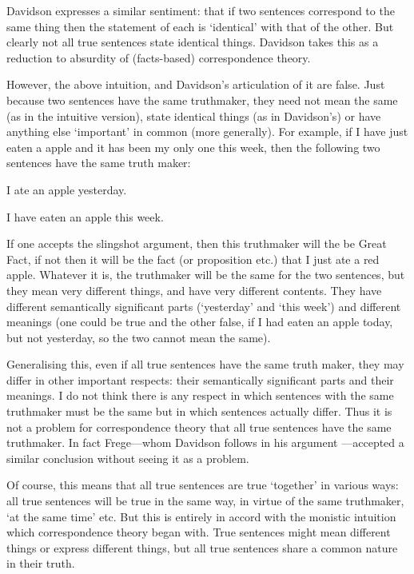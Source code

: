 Davidson expresses a similar sentiment: that if two sentences correspond to the same thing then the statement of each is `identical' with that of the other.
But clearly not all true sentences state identical things.
Davidson takes this as a reduction to absurdity of (facts-based) correspondence theory. %
\parencite[750]{Davidson_1969}

However, the above intuition, and Davidson's articulation of it are false.
Just because two sentences have the same truthmaker, they need not mean the same (as in the intuitive version), state identical things (as in Davidson's) or have anything else `important' in common (more generally).
For example, if I have just eaten a apple and it has been my only one this week, then the following two sentences have the same truth maker:

	\begin{example} \label{yesterday}
	I ate an apple yesterday.
	\end{example}

	\begin{example} \label{week}
	I have eaten an apple this week.
	\end{example}

If one accepts the slingshot argument, then this truthmaker will the be Great Fact, if not then it will be the fact (or proposition etc.) that I just ate a red apple.
Whatever it is, the truthmaker will be the same for the two sentences, but they mean very different things, and have very different contents.
They have different semantically significant parts (`yesterday' and `this week') and different meanings (one could be true and the other false, if I had eaten an apple today, but not yesterday, so the two cannot mean the same).

Generalising this, even if all true sentences have the same truth maker, they may differ in other important respects: their semantically significant parts and their meanings.
I do not think there is any respect in which sentences with the same truthmaker must be the same but in which sentences actually differ.
Thus it is not a problem for correspondence theory that all true sentences have the same truthmaker.
In fact Frege---whom Davidson follows in his argument \parencite[750]{Davidson_1969}---accepted a similar conclusion without seeing it as a problem.
\parencite[216]{Frege_1948}

Of course, this means that all true sentences are true `together' in various ways: all true sentences will be true in the same way, in virtue of the same truthmaker, `at the same time' etc.
But this is entirely in accord with the monistic intuition which correspondence theory began with.
True sentences might mean different things or express different things, but all true sentences share a common nature in their truth.
